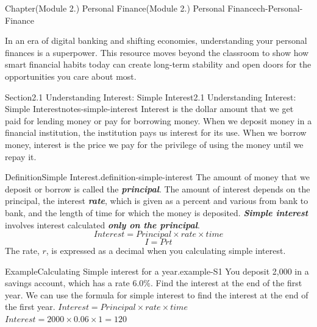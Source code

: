 \documentclass[oneside,10pt,]{book}
\newcommand{\alert}[1]{\textbf{\textit{#1}}}
\begin{document}
\begin{chapterptx}{Chapter}{(Module 2.) Personal Finance}{}{(Module 2.) Personal Finance}{}{}{ch-Personal-Finance}
\renewcommand*{\chaptername}{Chapter}
\begin{introduction}{}%
In an era of digital banking and shifting economies, understanding your personal finances is a superpower. This resource moves beyond the classroom to show how smart financial habits today can create long-term stability and open doors for the opportunities you care about most.%
\end{introduction}%
%
%
\typeout{************************************************}
\typeout{************************************************}
%
\begin{sectionptx}{Section}{2.1 Understanding Interest: Simple Interest}{}{2.1 Understanding Interest: Simple Interest}{}{}{notes-simple-interest}
Interest is the dollar amount that we get paid for lending money or pay for borrowing money. When we deposit money in a financial institution, the institution pays us interest for its use. When we borrow money, interest is the price we pay for the privilege of using the money until we repay it.%
\begin{definition}{Definition}{Simple Interest.}{definition-simple-interest}%
The amount of money that we deposit or borrow is called the \alert{principal}. The amount of interest depends on the principal, the interest \alert{rate}, which is given as a percent and various from bank to bank, and the length of time for which the money is deposited. \alert{Simple interest} involves interest calculated \alert{only on the principal}. \alert{%
\begin{equation*}
Interest = Principal \times rate \times time
\end{equation*}
}%
%
\begin{equation*}
I = Prt
\end{equation*}
The rate, \(r\), is expressed as a decimal when you calculating simple interest.%
\end{definition}
\begin{example}{Example}{Calculating Simple interest for a year.}{example-S1}%
You deposit \textdollar{}2,000 in a savings account, which has a rate 6.0\%. Find the interest at the end of the first year.%
\noindent\hypertarget{example-S1-3}{}We can use the formula for simple interest to find the interest at the end of the first year. \(Interest = Principal \times rate \times time\) \(Interest = 2000 \times 0.06 \times 1 = 120\)%

\end{example}
\end{sectionptx}
\end{chapterptx}
\end{document}
